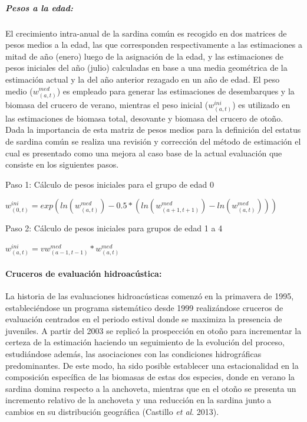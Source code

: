 \documentclass[
  spanish,
]{article}
\begin{document}
\hypertarget{pesos-a-la-edad}{%
\subparagraph{Pesos a la edad:}\label{pesos-a-la-edad}}

El crecimiento intra-anual de la sardina común es recogido en dos
matrices de pesos medios a la edad, las que corresponden respectivamente
a las estimaciones a mitad de año (enero) luego de la asignación de la
edad, y las estimaciones de pesos iniciales del año (julio) calculadas
en base a una media geométrica de la estimación actual y la del año
anterior rezagado en un año de edad. El peso medio (\(w_{(a,t)}^{med}\))
es empleado para generar las estimaciones de desembarques y la biomasa
del crucero de verano, mientras el peso inicial (\(w_{(a,t)}^{ini}\)) es
utilizado en las estimaciones de biomasa total, desovante y biomasa del
crucero de otoño. Dada la importancia de esta matriz de pesos medios
para la definición del estatus de sardina común se realiza una revisión
y corrección del método de estimación el cual es presentado como una
mejora al caso base de la actual evaluación que consiste en los
siguientes pasos.

Paso 1: Cálculo de pesos iniciales para el grupo de edad 0

\begin{center} 
$w_{(0,t)}^{ini}=exp(ln(w_{(a,t)}^{med} )-0.5*(ln(w_{(a+1,t+1)}^{med} )-ln(w_{(a,t)}^{med} )))$
\end{center}

Paso 2: Cálculo de pesos iniciales para grupos de edad 1 a 4

\begin{center} 
$w_{(a,t)}^{ini}=vw_{(a-1,t-1)}^{med}*w_{(a,t)}^{med}$
\end{center}

\hypertarget{cruceros-de-evaluaciuxf3n-hidroacuxfastica}{%
\paragraph{Cruceros de evaluación
hidroacústica:}\label{cruceros-de-evaluaciuxf3n-hidroacuxfastica}}

La historia de las evaluaciones hidroacústicas comenzó en la primavera
de 1995, estableciéndose un programa sistemático desde 1999 realizándose
cruceros de evaluación centrados en el periodo estival donde se maximiza
la presencia de juveniles. A partir del 2003 se replicó la prospección
en otoño para incrementar la certeza de la estimación haciendo un
seguimiento de la evolución del proceso, estudiándose además, las
asociaciones con las condiciones hidrográficas predominantes. De este
modo, ha sido posible establecer una estacionalidad en la composición
específica de las biomasas de estas dos especies, donde en verano la
sardina domina respecto a la anchoveta, mientras que en el otoño se
presenta un incremento relativo de la anchoveta y una reducción en la
sardina junto a cambios en su distribución geográfica (Castillo \emph{et
al}. 2013).
\end{document}
